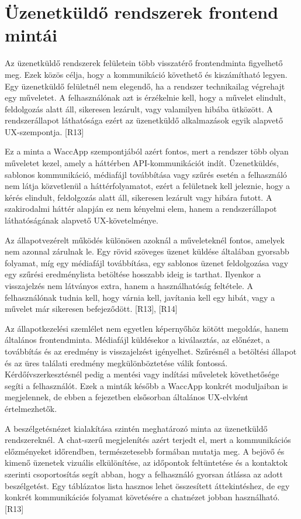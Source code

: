 \section{Üzenetküldő rendszerek frontend mintái}

Az üzenetküldő rendszerek felületein több visszatérő frontendminta figyelhető meg. Ezek közös célja, hogy a kommunikáció követhető és kiszámítható legyen. Egy üzenetküldő felületnél nem elegendő, ha a rendszer technikailag végrehajt egy műveletet. A felhasználónak azt is érzékelnie kell, hogy a művelet elindult, feldolgozás alatt áll, sikeresen lezárult, vagy valamilyen hibába ütközött. A rendszerállapot láthatósága ezért az üzenetküldő alkalmazások egyik alapvető UX-szempontja. [R13]

Ez a minta a WaccApp szempontjából azért fontos, mert a rendszer több olyan műveletet kezel, amely a háttérben API-kommunikációt indít. Üzenetküldés, sablonos kommunikáció, médiafájl továbbítása vagy szűrés esetén a felhasználó nem látja közvetlenül a háttérfolyamatot, ezért a felületnek kell jeleznie, hogy a kérés elindult, feldolgozás alatt áll, sikeresen lezárult vagy hibára futott. A szakirodalmi háttér alapján ez nem kényelmi elem, hanem a rendszerállapot láthatóságának alapvető UX-követelménye.

Az állapotvezérelt működés különösen azoknál a műveleteknél fontos, amelyek nem azonnal zárulnak le. Egy rövid szöveges üzenet küldése általában gyorsabb folyamat, míg egy médiafájl továbbítása, egy sablonos üzenet feldolgozása vagy egy szűrési eredménylista betöltése hosszabb ideig is tarthat. Ilyenkor a visszajelzés nem látványos extra, hanem a használhatóság feltétele. A felhasználónak tudnia kell, hogy várnia kell, javítania kell egy hibát, vagy a művelet már sikeresen befejeződött. [R13], [R14]

Az állapotkezelési szemlélet nem egyetlen képernyőhöz kötött megoldás, hanem általános frontendminta. Médiafájl küldésekor a kiválasztás, az előnézet, a továbbítás és az eredmény is visszajelzést igényelhet. Szűrésnél a betöltési állapot és az üres találati eredmény megkülönböztetése válik fontossá. Kérdőívszerkesztésnél pedig a mentési vagy indítási műveletek követhetősége segíti a felhasználót. Ezek a minták később a WaccApp konkrét moduljaiban is megjelennek, de ebben a fejezetben elsősorban általános UX-elvként értelmezhetők.

A beszélgetésnézet kialakítása szintén meghatározó minta az üzenetküldő rendszereknél. A chat-szerű megjelenítés azért terjedt el, mert a kommunikációs előzményeket időrendben, természetesebb formában mutatja meg. A bejövő és kimenő üzenetek vizuális elkülönítése, az időpontok feltüntetése és a kontaktok szerinti csoportosítás segít abban, hogy a felhasználó gyorsan átlássa az adott beszélgetést. Egy táblázatos lista hasznos lehet összesített áttekintéshez, de egy konkrét kommunikációs folyamat követésére a chatnézet jobban használható. [R13]

